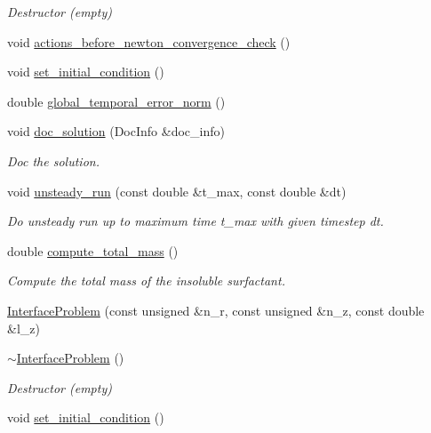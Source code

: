 \begin{DoxyCompactItemize}
\begin{DoxyCompactList}\small\item\em Destructor (empty) \end{DoxyCompactList}\item 
void \hyperlink{classInterfaceProblem_ab4193771472aefce4cd67261491cc344}{actions\+\_\+before\+\_\+newton\+\_\+convergence\+\_\+check} ()
\item 
void \hyperlink{classInterfaceProblem_a0d3af8378c4f0a6e38636be958c300d5}{set\+\_\+initial\+\_\+condition} ()
\item 
double \hyperlink{classInterfaceProblem_a5eb5fa3bf4e7884984f285e24ba3ee7b}{global\+\_\+temporal\+\_\+error\+\_\+norm} ()
\item 
void \hyperlink{classInterfaceProblem_a49714e35e94f7d2af0b6ddd22b851f52}{doc\+\_\+solution} (Doc\+Info \&doc\+\_\+info)
\begin{DoxyCompactList}\small\item\em Doc the solution. \end{DoxyCompactList}\item 
void \hyperlink{classInterfaceProblem_adf1f4e43d10939e4323e0e315b711085}{unsteady\+\_\+run} (const double \&t\+\_\+max, const double \&dt)
\begin{DoxyCompactList}\small\item\em Do unsteady run up to maximum time t\+\_\+max with given timestep dt. \end{DoxyCompactList}\item 
double \hyperlink{classInterfaceProblem_a9b19bc90667fe8c7885d8ee113812e27}{compute\+\_\+total\+\_\+mass} ()
\begin{DoxyCompactList}\small\item\em Compute the total mass of the insoluble surfactant. \end{DoxyCompactList}\item 
\hyperlink{classInterfaceProblem_af1ab49eb511b5a8db27e7b4e509a0c5c}{Interface\+Problem} (const unsigned \&n\+\_\+r, const unsigned \&n\+\_\+z, const double \&l\+\_\+z)
\item 
\hyperlink{classInterfaceProblem_a90c191f8046069099b199743e7ce7111}{$\sim$\+Interface\+Problem} ()
\begin{DoxyCompactList}\small\item\em Destructor (empty) \end{DoxyCompactList}\item 
void \hyperlink{classInterfaceProblem_a0d3af8378c4f0a6e38636be958c300d5}{set\+\_\+initial\+\_\+condition} ()

\end{DoxyCompactItemize}
